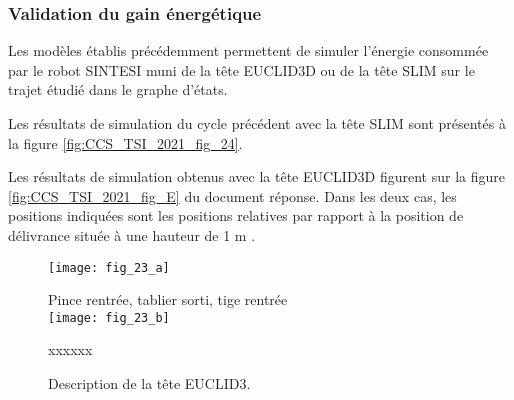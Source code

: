 \subsubsection{Validation du gain énergétique}

Les modèles établis précédemment permettent de simuler l'énergie consommée par le robot SINTESI muni de la tête EUCLID3D ou de la tête SLIM sur le trajet étudié dans le graphe d'états.

Les résultats de simulation du cycle précédent avec la tête SLIM sont présentés à la figure \ref{fig:CCS_TSI_2021_fig_24}.

Les résultats de simulation obtenus avec la tête EUCLID3D figurent sur la figure \ref{fig:CCS_TSI_2021_fig_E} du document réponse. Dans les deux cas, les positions indiquées sont les positions relatives par rapport à la position de délivrance située à une hauteur de 1 m .



\begin{figure}

\texttt{[image: fig\_23\_a]}

Pince rentrée, tablier sorti, tige rentrée\\
\texttt{[image: fig\_23\_b]}

\caption{\label{fig:CCS_TSI_2021_fig_23}Description de la tête EUCLID3.}
xxxxxx
\end{figure}

